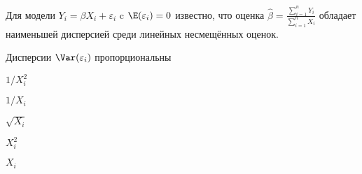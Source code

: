 
\begin{question}
Для модели \(Y_i = \beta X_i + \varepsilon_i\) c
\(\E(\varepsilon_i) = 0\) известно, что оценка
\(\hat \beta = \frac{\sum_{i=1}^n Y_i}{\sum_{i=1}^n X_i}\) обладает
наименьшей дисперсией среди линейных несмещённых оценок.

Дисперсии \(\Var(\varepsilon_i)\) пропорциональны
\begin{answerlist}
  \item \(1/X_i^2\)
  \item \(1/X_i\)
  \item \(\sqrt{X_i}\)
  \item \(X_i^2\)
  \item \(X_i\)
\end{answerlist}
\end{question}


